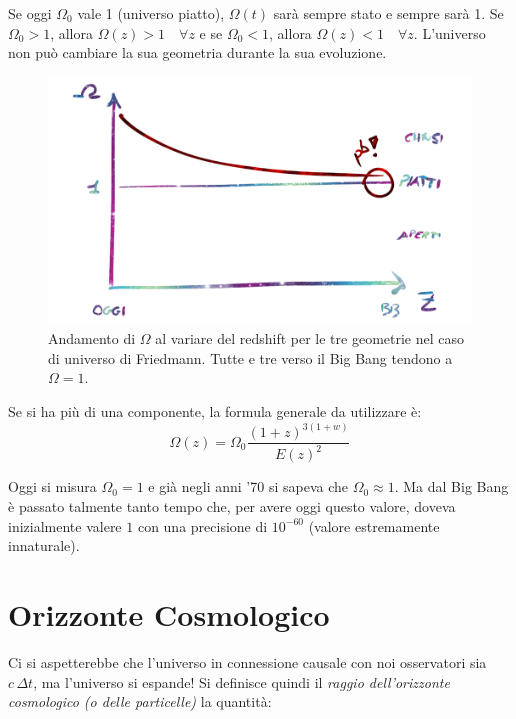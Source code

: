 Se oggi $\Omega_0$ vale 1 (universo piatto), $\Omega(t)$ sarà sempre stato e sempre sarà 1. Se $\Omega_0 > 1$, allora $\Omega(z) > 1\quad \forall z$ e se $\Omega_0 < 1$, allora $\Omega(z) < 1\quad \forall z$. L'universo non può cambiare la sua geometria durante la sua evoluzione.
\begin{figure}[ht]
    \centering
    \includegraphics[width=.8\textwidth]{Pictures/2/omega-z.png}
    \caption{Andamento di $\Omega$ al variare del redshift per le tre geometrie nel caso di universo di Friedmann. Tutte e tre verso il Big Bang tendono a $\Omega = 1$.}
    \label{fig:2omegaz}
\end{figure}

Se si ha più di una componente, la formula generale da utilizzare è:
\begin{equation}
    \Omega (z) = \Omega_0 \frac{(1+z)^{3(1+w)}}{E(z)^2}
\end{equation}


\begin{definition}
 Oggi si misura $\Omega_0 =1$ e già negli anni '70 si sapeva che $\Omega_0 \approx 1$. Ma dal Big Bang è passato talmente tanto tempo che, per avere oggi questo valore, doveva inizialmente valere $1$ con una precisione di $10^{-60}$ (valore estremamente innaturale). 
\end{definition}


\section{Orizzonte Cosmologico}
Ci si aspetterebbe che l'universo in connessione causale con noi osservatori sia $c\, \Delta t$, ma l'universo si espande! Si definisce quindi il \textit{raggio dell'orizzonte cosmologico (o delle particelle)} la quantità:

